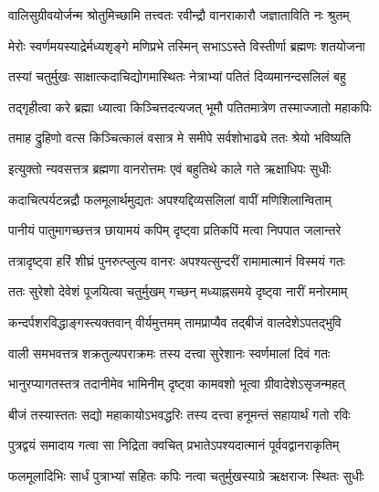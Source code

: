 



\twolineshloka
{वालिसुग्रीवयोर्जन्म श्रोतुमिच्छामि तत्त्वतः}
{रवीन्द्रौ वानराकारौ जज्ञाताविति नः श्रुतम्} %


\twolineshloka
{मेरोः स्वर्णमयस्याद्रेर्मध्यशृङ्गे मणिप्रभे}
{तस्मिन् सभाऽऽस्ते विस्तीर्णा ब्रह्मणः शतयोजना} %

\twolineshloka
{तस्यां चतुर्मुखः साक्षात्कदाचिद्योगमास्थितः}
{नेत्राभ्यां पतितं दिव्यमानन्दसलिलं बहु} %

\twolineshloka
{तद्गृहीत्वा करे ब्रह्मा ध्यात्वा किञ्चित्तदत्यजत्}
{भूमौ पतितमात्रेण तस्माज्जातो महाकपिः} %

\twolineshloka
{तमाह द्रुहिणो वत्स किञ्चित्कालं वसात्र मे}
{समीपे सर्वशोभाढ्ये ततः श्रेयो भविष्यति} %

\twolineshloka
{इत्युक्तो न्यवसत्तत्र ब्रह्मणा वानरोत्तमः}
{एवं बहुतिथे काले गते ऋक्षाधिपः सुधीः} %

\twolineshloka
{कदाचित्पर्यटन्नद्रौ फलमूलार्थमुद्यतः}
{अपश्यद्दिव्यसलिलां वापीं मणिशिलान्विताम्} %

\twolineshloka
{पानीयं पातुमागच्छत्तत्र छायामयं कपिम्}
{दृष्ट्वा प्रतिकपिं मत्वा निपपात जलान्तरे} %

\twolineshloka
{तत्रादृष्ट्वा हरिं शीघ्रं पुनरुत्प्लुत्य वानरः}
{अपश्यत्सुन्दरीं रामामात्मानं विस्मयं गतः} %

\twolineshloka
{ततः सुरेशो देवेशं पूजयित्वा चतुर्मुखम्}
{गच्छन् मध्याह्नसमये दृष्ट्वा नारीं मनोरमाम्} %

\twolineshloka
{कन्दर्पशरविद्धाङ्गस्त्यक्तवान् वीर्यमुत्तमम्}
{तामप्राप्यैव तद्बीजं वालदेशेऽपतद्भुवि} %

\twolineshloka
{वाली समभवत्तत्र शक्रतुल्यपराक्रमः}
{तस्य दत्त्वा सुरेशानः स्वर्णमालां दिवं गतः} %

\twolineshloka
{भानुरप्यागतस्तत्र तदानीमेव भामिनीम्}
{दृष्ट्वा कामवशो भूत्वा ग्रीवादेशेऽसृजन्महत्} %

\twolineshloka
{बीजं तस्यास्ततः सद्यो महाकायोऽभवद्धरिः}
{तस्य दत्त्वा हनूमन्तं सहायार्थं गतो रविः} %

\twolineshloka
{पुत्रद्वयं समादाय गत्वा सा निद्रिता क्वचित्}
{प्रभातेऽपश्यदात्मानं पूर्ववद्वानराकृतिम्} %

\twolineshloka
{फलमूलादिभिः सार्धं पुत्राभ्यां सहितः कपिः}
{नत्वा चतुर्मुखस्याग्रे ऋक्षराजः स्थितः सुधीः} %

